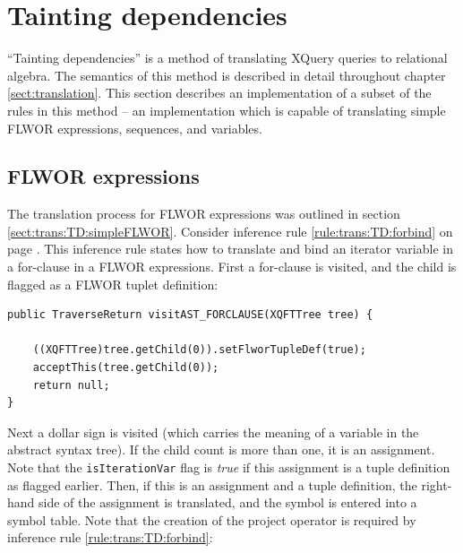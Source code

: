 \section{Tainting dependencies}
\label{sect:impl:tainting_deps}
``Tainting dependencies'' is a method of translating XQuery queries to
relational algebra. The semantics of this method is described in detail
throughout chapter \ref{sect:translation}. This section
describes an implementation of a subset of the rules in this method -- an
implementation which is capable of translating simple FLWOR expressions,
sequences, and variables.

\subsection{FLWOR expressions}
The translation process for FLWOR expressions was outlined in section
\ref{sect:trans:TD:simpleFLWOR}. Consider inference rule
\ref{rule:trans:TD:forbind} on page \pageref{rule:trans:TD:forbind}. This
inference rule states how to translate and bind an iterator variable in a
for-clause in a FLWOR expressions. First a for-clause is visited, and the
child is flagged as a FLWOR tuplet definition:

\begin{Verbatim}
public TraverseReturn visitAST_FORCLAUSE(XQFTTree tree) {

    ((XQFTTree)tree.getChild(0)).setFlworTupleDef(true);
    acceptThis(tree.getChild(0));
    return null;
}
\end{Verbatim}

Next a dollar sign is visited (which carries the meaning of a variable in the
abstract syntax tree). If the child count is more than one, it is an
assignment. Note that the \texttt{isIterationVar} flag is \textit{true} if
this assignment is a tuple definition as flagged earlier. Then, if this is an
assignment and a tuple definition, the right-hand side of the assignment is
translated, and the symbol is entered into a symbol table. Note that the
creation of the project operator is required by inference rule
\ref{rule:trans:TD:forbind}:

